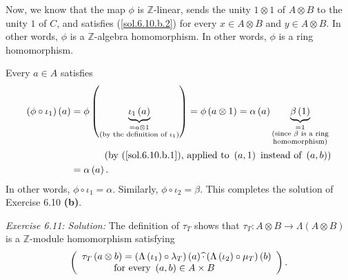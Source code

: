 \documentclass[numbers=enddot,12pt,final,onecolumn,notitlepage]{scrartcl}%
\begin{document}
Now, we know that the map $\phi$ is $\mathbb{Z}$-linear, sends the unity
$1\otimes1$ of $A\otimes B$ to the unity $1$ of $C$, and satisfies
(\ref{sol.6.10.b.2}) for every $x\in A\otimes B$ and $y\in A\otimes B$. In
other words, $\phi$ is a $\mathbb{Z}$-algebra homomorphism. In other words,
$\phi$ is a ring homomorphism.

Every $a\in A$ satisfies%
\begin{align*}
\left(  \phi\circ\iota_{1}\right)  \left(  a\right)   &  =\phi\left(
\underbrace{\iota_{1}\left(  a\right)  }_{\substack{=a\otimes1\\\text{(by the
definition of }\iota_{1}\text{)}}}\right)  =\phi\left(  a\otimes1\right)
=\alpha\left(  a\right)  \underbrace{\beta\left(  1\right)  }%
_{\substack{=1\\\text{(since }\beta\text{ is a ring}\\\text{homomorphism)}}}\\
&  \ \ \ \ \ \ \ \ \ \ \left(  \text{by (\ref{sol.6.10.b.1}), applied to
}\left(  a,1\right)  \text{ instead of }\left(  a,b\right)  \right) \\
&  =\alpha\left(  a\right)  .
\end{align*}
In other words, $\phi\circ\iota_{1}=\alpha$. Similarly, $\phi\circ\iota
_{2}=\beta$. This completes the solution of Exercise 6.10 \textbf{(b)}.

\textit{Exercise 6.11: Solution:} The definition of $\tau_{T}$ shows that
$\tau_{T}:A\otimes B\rightarrow\Lambda\left(  A\otimes B\right)  $ is a
$\mathbb{Z}$-module homomorphism satisfying%
\begin{equation}
\left(
\begin{array}
[c]{l}%
\tau_{T}\left(  a\otimes b\right)  =\left(  \Lambda\left(  \iota_{1}\right)
\circ\lambda_{T}\right)  \left(  a\right)  \widehat{\cdot}\left(
\Lambda\left(  \iota_{2}\right)  \circ\mu_{T}\right)  \left(  b\right) \\
\ \ \ \ \ \ \ \ \ \ \text{for every }\left(  a,b\right)  \in A\times B
\end{array}
\right)  . \label{sol.6.11.tauT-def}%
\end{equation}
\end{document}
